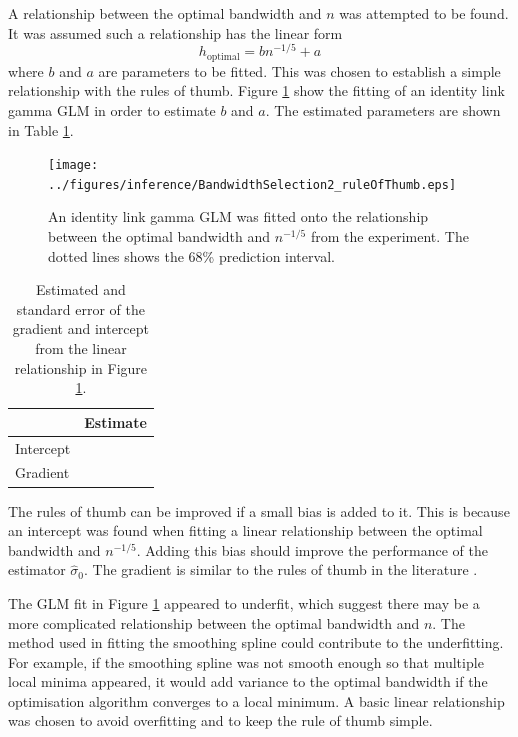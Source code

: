 A relationship between the optimal bandwidth and $n$ was attempted to be found. It was assumed such a relationship has the linear form
\begin{equation}
  h_{\text{optimal}} = b n^{-1/5} + a
\end{equation}
where $b$ and $a$ are parameters to be fitted. This was chosen to establish a simple relationship with the rules of thumb. Figure \ref{fig:inference_BandwidthSelection2_ruleOfThumb} show the fitting of an identity link gamma GLM in order to estimate $b$ and $a$. The estimated parameters are shown in Table \ref{table:inference_BandwidthSelection2_ruleOfThumb}.

\begin{figure}
  \centering
  \texttt{[image: ../figures/inference/BandwidthSelection2\_ruleOfThumb.eps]}
  \caption{An identity link gamma GLM was fitted onto the relationship between the optimal bandwidth and $n^{-1/5}$ from the experiment. The dotted lines shows the 68\% prediction interval.}
  \label{fig:inference_BandwidthSelection2_ruleOfThumb}
\end{figure}

\begin{table}
  \centering
  \begin{tabular}{l|l}
           &Estimate \\ \hline
  Intercept&\\
  Gradient &
  \end{tabular}
  \caption{Estimated and standard error of the gradient and intercept from the linear relationship in Figure \ref{fig:inference_BandwidthSelection2_ruleOfThumb}.}
  \label{table:inference_BandwidthSelection2_ruleOfThumb}
\end{table}

The rules of thumb can be improved if a small bias is added to it. This is because an intercept was found when fitting a linear relationship between the optimal bandwidth and $n^{-1/5}$. Adding this bias should improve the performance of the estimator $\widehat{\sigma}_0$. The gradient is similar to the rules of thumb in the literature \citep{sheather2004density}.

The GLM fit in Figure \ref{fig:inference_BandwidthSelection2_ruleOfThumb} appeared to underfit, which suggest there may be a more complicated relationship between the optimal bandwidth and $n$. The method used in fitting the smoothing spline could contribute to the underfitting. For example, if the smoothing spline was not smooth enough so that multiple local minima appeared, it would add variance to the optimal bandwidth if the optimisation algorithm converges to a local minimum. A basic linear relationship was chosen to avoid overfitting and to keep the rule of thumb simple.

